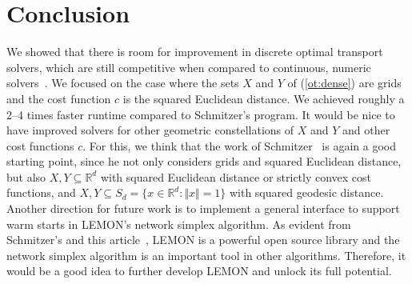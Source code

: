 \documentclass[a4paper,UKenglish,cleveref, autoref, thm-restate]{lipics-v2021}
\begin{document}
\section{Conclusion}
We showed that there is room for improvement in discrete optimal transport solvers, which are still competitive when compared to continuous, numeric solvers~\cite{schrieber2017dotmark}.
We focused on the case where the sets $X$ and $Y$ of (\ref{ot:dense}) are grids and the cost function $c$ is the squared Euclidean distance.
We achieved roughly a 2--4 times faster runtime compared to Schmitzer's program.
It would be nice to have improved solvers for other geometric constellations of $X$ and $Y$ and other cost functions $c$.
For this, we think that the work of Schmitzer~\cite{schmitzer2016sparse} is again a good starting point, since he not only considers grids and squared Euclidean distance, but also $X,Y \subseteq \mathbb{R}^d$ with squared Euclidean distance or strictly convex cost functions, and $X,Y \subseteq S_d = \{x \in \mathbb{R}^d: \Vert x \Vert = 1\}$ with squared geodesic distance.
Another direction for future work is to implement a general interface to support warm starts in LEMON's network simplex algorithm.
As evident from Schmitzer's and this article~\cite{schmitzer2016sparse}, LEMON is a powerful open source library and the network simplex algorithm is an important tool in other algorithms.
Therefore, it would be a good idea to further develop LEMON and unlock its full potential.


%

\newpage
\appendix
\end{document}
